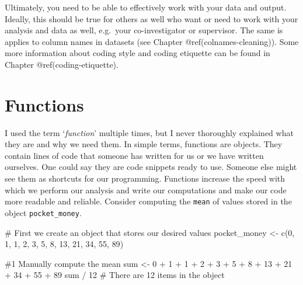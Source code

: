 \documentclass[
  letterpaper,
]{krantz}
\makeatletter
\newenvironment{Shaded}{\begin{snugshade}}{\end{snugshade}}
\newcommand{\CommentTok}[1]{\textcolor[rgb]{0.37,0.37,0.37}{#1}}
\newcommand{\DecValTok}[1]{\textcolor[rgb]{0.68,0.00,0.00}{#1}}
\newcommand{\FunctionTok}[1]{\textcolor[rgb]{0.28,0.35,0.67}{#1}}
\newcommand{\NormalTok}[1]{\textcolor[rgb]{0.00,0.23,0.31}{#1}}
\newcommand{\OtherTok}[1]{\textcolor[rgb]{0.00,0.23,0.31}{#1}}
\newcommand{\SpecialCharTok}[1]{\textcolor[rgb]{0.37,0.37,0.37}{#1}}
\newenvironment{kframe}{%
\medskip{}
\setlength{\fboxsep}{.8em}
 \def\at@end@of@kframe{}%
 \ifinner\ifhmode%
  \def\at@end@of@kframe{\end{minipage}}%
  \begin{minipage}{\columnwidth}%
 \fi\fi%
 \def\FrameCommand##1{\hskip\@totalleftmargin \hskip-\fboxsep
 \colorbox{shadecolor}{##1}\hskip-\fboxsep
     \hskip-\linewidth \hskip-\@totalleftmargin \hskip\columnwidth}%
 \MakeFramed {\advance\hsize-\width
   \@totalleftmargin\z@ \linewidth\hsize
   \@setminipage}}%
 {\par\unskip\endMakeFramed%
 \at@end@of@kframe}
\renewenvironment{Shaded}{\begin{kframe}}{\end{kframe}}
\makeatother
\begin{document}
Ultimately, you need to be able to effectively work with your data and
output. Ideally, this should be true for others as well who want or need
to work with your analysis and data as well, e.g.~your co-investigator
or supervisor. The same is applies to column names in datasets (see
Chapter @ref(colnames-cleaning)). Some more information about coding
style and coding etiquette can be found in Chapter
@ref(coding-etiquette).

\section{Functions}\label{functions}

I used the term `\emph{function}' multiple times, but I never thoroughly
explained what they are and why we need them. In simple terms, functions
are objects. They contain lines of code that someone has written for us
or we have written ourselves. One could say they are code snippets ready
to use. Someone else might see them as shortcuts for our programming.
Functions increase the speed with which we perform our analysis and
write our computations and make our code more readable and reliable.
Consider computing the \texttt{mean} of values stored in the object
\texttt{pocket\_money}.

\begin{Shaded}
\begin{Highlighting}[]
\CommentTok{\# First we create an object that stores our desired values}
\NormalTok{pocket\_money }\OtherTok{\textless{}{-}} \FunctionTok{c}\NormalTok{(}\DecValTok{0}\NormalTok{, }\DecValTok{1}\NormalTok{, }\DecValTok{1}\NormalTok{, }\DecValTok{2}\NormalTok{, }\DecValTok{3}\NormalTok{, }\DecValTok{5}\NormalTok{, }\DecValTok{8}\NormalTok{, }\DecValTok{13}\NormalTok{, }\DecValTok{21}\NormalTok{, }\DecValTok{34}\NormalTok{, }\DecValTok{55}\NormalTok{, }\DecValTok{89}\NormalTok{)}

\CommentTok{\#1 Manually compute the mean}
\NormalTok{sum }\OtherTok{\textless{}{-}} \DecValTok{0} \SpecialCharTok{+} \DecValTok{1} \SpecialCharTok{+} \DecValTok{1} \SpecialCharTok{+} \DecValTok{2} \SpecialCharTok{+} \DecValTok{3} \SpecialCharTok{+} \DecValTok{5} \SpecialCharTok{+} \DecValTok{8} \SpecialCharTok{+} \DecValTok{13} \SpecialCharTok{+} \DecValTok{21} \SpecialCharTok{+} \DecValTok{34} \SpecialCharTok{+} \DecValTok{55} \SpecialCharTok{+} \DecValTok{89}
\NormalTok{sum }\SpecialCharTok{/} \DecValTok{12} \CommentTok{\# There are 12 items in the object}
\end{Highlighting}
\end{Shaded}
\end{document}

